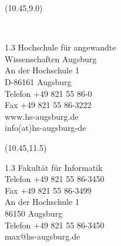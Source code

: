 \begin{textblock}{5}(10.45,9.0)
	\scriptsize
	\textcolor[rgb]{1,0,0}{\\
		\begin{flushleft}
			\begin{spacing} {1.3}
				Hochschule f\"ur angewandte\\
				Wissenschaften Augsburg\\
				\vspace{4pt}
				An der Hochschule 1\\
				D-86161 Augsburg\\
				\vspace{4pt}
				Telefon +49 821 55 86-0\\
				Fax +49 821 55 86-3222\\
				www.hs-augsburg.de\\
				info(at)hs-augsburg-de
			\end{spacing}
		\end{flushleft}
		}
\end{textblock}


\begin{textblock}{5}(10.45,11.5)
	\scriptsize
		\begin{flushleft}
			\begin{spacing} {1.3}
				Fakult\"at f\"ur Informatik\\
				Telefon +49 821 55 86-3450\\
				Fax \hspace{10pt} +49 821 55 86-3499\\
				\vspace{6pt}
				An der Hochschule 1\\
				86150 Augsburg\\
				Telefon +49 821 55 86-3450\\
				max@hs-augsburg.de\\
			\end{spacing}
		\end{flushleft}
	\end{textblock}
\pagebreak